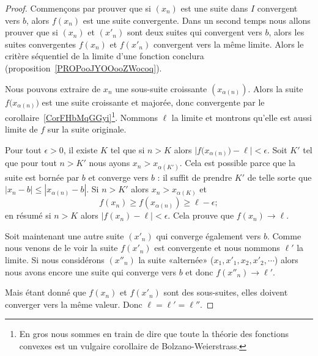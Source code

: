 \begin{proof}
    Commençons par prouver que si \( (x_n)\) est une suite dans \( I\) convergent vers \( b\), alors \( f(x_n)\) est une suite convergente. Dans un second temps nous allons prouver que si \( (x_n)\) et \( (x'_n)\) sont deux suites qui convergent vers \( b\), alors les suites convergentes \( f(x_n)\) et \( f(x'_n)\) convergent vers la même limite. Alors le critère séquentiel de la limite d'une fonction conclura (proposition~\ref{PROPooJYOOooZWocoq}).

    Nous pouvons extraire de \( x_n\) une sous-suite croissante \( (x_{\alpha(n)})\). Alors la suite \( f\big( x_{\alpha(n)} \big)\) est une suite croissante et majorée, donc convergente par le corollaire~\ref{CorFHbMqGGyi}\footnote{En gros nous sommes en train de dire que toute la théorie des fonctions convexes est un vulgaire corollaire de Bolzano-Weierstrass.}. Nommons \( \ell\) la limite et montrons qu'elle est aussi limite de \( f\) sur la suite originale.

    Pour tout \( \epsilon>0\), il existe \( K\) tel que si \( n>K\) alors \( \big| f\big( x_{\alpha(n)} \big)-\ell \big|<\epsilon\). Soit \( K'\) tel que pour tout \( n>K'\) nous ayons \( x_n>x_{\alpha(K')}\). Cela est possible parce que la suite est bornée par \( b\) et converge vers \( b\) : il suffit de prendre \( K'\) de telle sorte que \( | x_n-b |\leq | x_{\alpha(n)}-b |\). Si \( n>K'\) alors \( x_n>x_{\alpha(K)}\) et
    \begin{equation}
        f(x_n)\geq f(x_{\alpha(n)})\geq \ell-\epsilon;
    \end{equation}
    en résumé si \( n>K\) alors \( | f(x_n)-\ell |<\epsilon\). Cela prouve que \( f(x_n)\to\ell\).

    Soit maintenant une autre suite \( (x'_n)\) qui converge également vers \( b\). Comme nous venons de le voir la suite \( f(x'_n)\) est convergente et nous nommons \( \ell'\) la limite. Si nous considérons \( (x''_n)\) la suite «alternée» (\( x_1,x'_1,x_2,x'_2,\cdots\)) alors nous avons encore une suite qui converge vers \( b\) et donc \( f(x''_n)\to \ell'\).

    Mais étant donné que \( f(x_n)\) et \( f(x'_n)\) sont des sous-suites, elles doivent converger vers la même valeur. Donc \( \ell=\ell'=\ell''\).
\end{proof}


